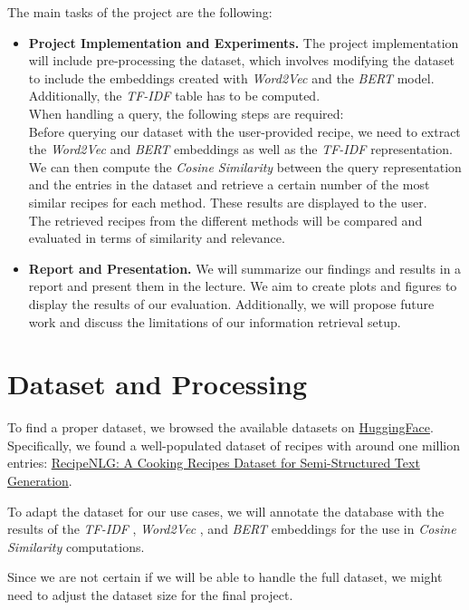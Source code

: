 \documentclass{article}
\newcommand{\wordtovec}{\textit{Word2Vec} }
\newcommand{\bert}{\textit{BERT} }
\newcommand{\tfidf}{\textit{TF-IDF} }
\newcommand{\cossim}{\textit{Cosine Similarity} }
\newcommand{\huggingface}{\href{https://huggingface.co/datasets/} {HuggingFace}}
\newcommand{\dataset}{\href{https://huggingface.co/datasets/mbien/recipe_nlg}{RecipeNLG: A Cooking Recipes Dataset for Semi-Structured Text Generation}}
\begin{document}
The main tasks of the project are the following:
\begin{itemize}
    \item \textbf{Project Implementation and Experiments.} 
    The project implementation will include pre-processing the dataset, which involves modifying the dataset to include the embeddings created with \wordtovec and the \bert model. 
    Additionally, the \tfidf table has to be computed. \\
    When handling a query, the following steps are required: \\
    Before querying our dataset with the user-provided recipe, we need to extract the \wordtovec and \bert embeddings as well as the \tfidf representation.
    We can then compute the \cossim between the query representation and the entries in the dataset and retrieve a certain number of the most similar recipes for each method.
    These results are displayed to the user. \\
    The retrieved recipes from the different methods will be compared and evaluated in terms of similarity and relevance.
    
    \item \textbf{Report and Presentation.} 
    We will summarize our findings and results in a report and present them in the lecture. 
    We aim to create plots and figures to display the results of our evaluation.
    Additionally, we will propose future work and discuss the limitations of our information retrieval setup.
\end{itemize}


\section{Dataset and Processing}
To find a proper dataset, we browsed the available datasets on \huggingface.
Specifically, we found a well-populated dataset of recipes with around one million entries: \dataset \cite{bien-etal-2020-recipenlg}. 

To adapt the dataset for our use cases, we will annotate the database with the results of the \tfidf, \wordtovec, and \bert embeddings for the use in \textit{Cosine Similarity} computations.

Since we are not certain if we will be able to handle the full dataset, we might need to adjust the dataset size for the final project.
\end{document}
